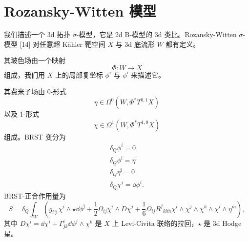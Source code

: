 

\section{Rozansky-Witten 模型}

我们描述一个 3d 拓扑 $\sigma$-模型，它是 2d B-模型的 3d 类比。Rozansky-Witten $\sigma$-模型 [14] 对任意超 Kähler 靶空间 $X$ 与 3d 底流形 $W$ 都有定义。

其玻色场由一个映射
\[
  \Phi:W\to X
\]
组成，我们用 $X$ 上的局部复坐标 $\phi^i$ 与 $\phi^{\bar\imath}$ 来描述它。

其费米子场由 0-形式
\[
  \eta\in\Omega^0(W,\Phi^*T^{0,1}X)
\]
以及 1-形式
\[
  \chi\in\Omega^1(W,\Phi^*T^{1,0}X)
\]
组成。BRST 变分为
\begin{gather*}
  \delta_Q\phi^i=0\\
  \delta_Q\phi^{\bar\imath}=\eta^{\bar\imath}\\
  \delta_Q\eta^{\bar\imath}=0\\
  \delta_Q\chi^i=\dd\phi^i.
\end{gather*}
BRST-正合作用量为
\[
  S=\delta_Q\int_W\left(g_{i\bar\jmath}\chi^i\wedge\star\dd\phi^{\bar\jmath}
  +\frac12\Omega_{ij}\chi^i\wedge D\chi^j
  +\frac16\Omega_{ij}R^j{}_{kl\bar m}\chi^i\wedge\chi^j\wedge\chi^k\wedge\chi^i\wedge\eta^{\bar m}\right),
\]
其中 $D\chi^i=\dd\chi^i+\Gamma^i_{jk}\dd\phi^j\wedge\chi^k$ 是 $X$ 上 Levi-Civita 联络的拉回，$\star$ 是 3d Hodge 星。



